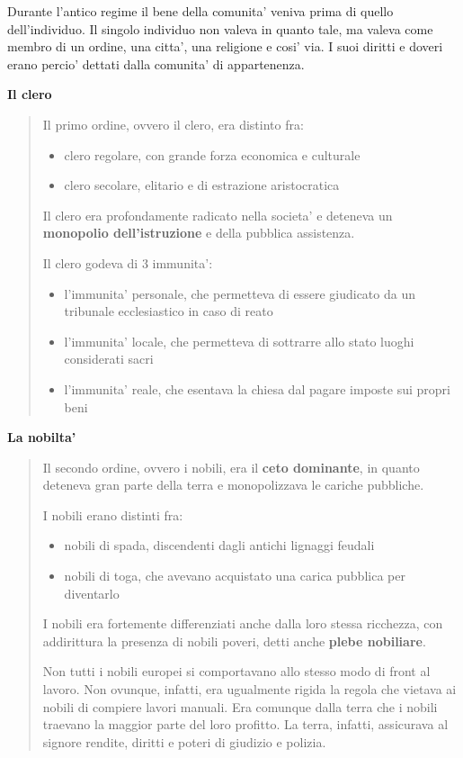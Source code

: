 \documentclass{article}
\begin{document}
{{    Durante l'antico regime il bene della comunita' veniva prima di quello dell'individuo. Il singolo individuo non valeva in quanto tale, ma valeva come membro di un ordine, una citta', una religione e cosi' via. I suoi diritti e doveri erano percio' dettati dalla comunita' di appartenenza.

    \textbf{Il clero}
    \begin{quote}
      Il primo ordine, ovvero il clero, era distinto fra:
      \begin{itemize}
        \item clero regolare, con grande forza economica e culturale
        \item clero secolare, elitario e di estrazione aristocratica
      \end{itemize}
      Il clero era profondamente radicato nella societa' e deteneva un \textbf{monopolio dell'istruzione} e della pubblica assistenza.

      Il clero godeva di 3 immunita':
      \begin{itemize}
        \item l'immunita' personale, che permetteva di essere giudicato da un tribunale ecclesiastico in caso di reato
        \item l'immunita' locale, che permetteva di sottrarre allo stato luoghi considerati sacri
        \item l'immunita' reale, che esentava la chiesa dal pagare imposte sui propri beni
      \end{itemize}
    \end{quote}

    \textbf{La nobilta'}
    \begin{quote}
      Il secondo ordine, ovvero i nobili, era il \textbf{ceto dominante}, in quanto deteneva gran parte della terra e monopolizzava le cariche pubbliche.

      I nobili erano distinti fra:
      \begin{itemize}
        \item nobili di spada, discendenti dagli antichi lignaggi feudali
        \item nobili di toga, che avevano acquistato una carica pubblica per diventarlo
      \end{itemize}

      I nobili era fortemente differenziati anche dalla loro stessa ricchezza, con addirittura la presenza di nobili poveri, detti anche \textbf{plebe nobiliare}.

      Non tutti i nobili europei si comportavano allo stesso modo di front al lavoro. Non ovunque, infatti, era ugualmente rigida la regola che vietava ai nobili di compiere lavori manuali. Era comunque dalla terra che i nobili traevano la maggior parte del loro profitto. La terra, infatti, assicurava al signore rendite, diritti e poteri di giudizio e polizia.
    \end{quote}

}}
\end{document}
